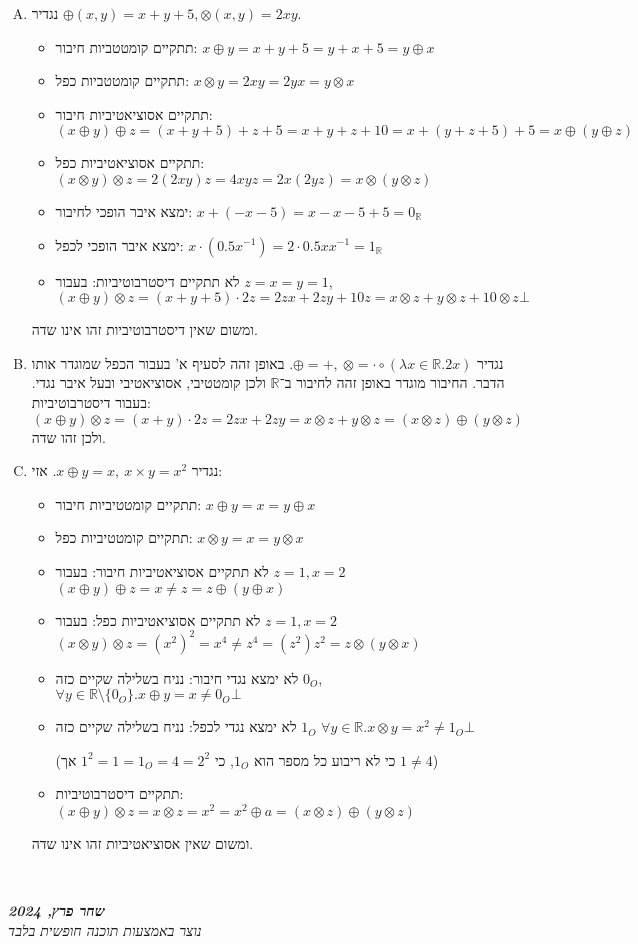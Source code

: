\documentclass[]{article}
\newcommand\ndoc  {\dotfill \\ \vfil {\begin{center} {\textbf{\textit{שחר פרץ, 2024}} \\ \scriptsize \textit{נוצר באמצעות תוכנה חופשית בלבד}} \end{center}} \vfil	}
\newcommand\R     {\mathbb{R}}
\newcommand\op    {^{-1}}
\begin{document}
	\begin{enumerate}[A.]
		\item נגדיר $\oplus(x, y) = x + y + 5, \otimes(x, y) = 2xy$. 
		\begin{itemize}
			\item תתקיים קומטטביות חיבור: \hfill $x \oplus y = x + y + 5 = y + x + 5 = y \oplus x$
			\item תתקיים קומטטביות כפל: \hfill $x \otimes y = 2xy = 2yx = y \otimes x$
			\item תתקיים אסוציאטיביות חיבור: \hfill $(x \oplus y)\oplus z = (x + y + 5) + z + 5 = x + y + z + 10 = x + (y + z + 5) + 5 = x \oplus (y \oplus z)$
			\item תתקיים אסוציאטיביות כפל: \hfill $(x \otimes y) \otimes z = 2(2xy)z = 4xyz = 2x(2yz) = x \otimes (y \otimes z)$
			\item ימצא איבר הופכי לחיבור: \hfill $x + (-x - 5) = x - x - 5 + 5 = 0_\R$
			\item ימצא איבר הופכי לכפל: \hfill $x \cdot (0.5x\op) = 2 \cdot 0.5 x x\op = 1_\R$
			\item לא תתקיים דיסטרבוטיביות: בעבור $z = x = y = 1$, \ \hfill $(x \oplus y) \otimes z = (x + y + 5) \cdot 2z = 2zx + 2zy + 10z = x \otimes z + y \otimes z + 10 \otimes z \bot$
		\end{itemize}
		ומשום שאין דיסטרבוטיביות זהו אינו שדה. 
		
		\item נגדיר $\oplus = +, \ \otimes = \cdot \circ (\lambda x \in \R. 2x)$. 
		באופן זהה לסעיף א' בעבור הכפל שמוגדר אותו הדבר. החיבור מוגדר באופן זהה לחיבור ב־$\R$ ולכן קומטטיבי, אסוציאטיבי ובעל איבר נגדי. בעבור דיסטרבוטיביות: 
		\[ (x \oplus y) \otimes z = (x + y) \cdot 2z = 2zx + 2zy = x \otimes z + y \otimes z = (x \otimes z) \oplus (y \otimes z) \]
		ולכן זהו שדה. 
		\item נגדיר $x \oplus y = x, \ x \times y = x^2$. אזי: 
		\begin{itemize}
			\item תתקיים קומטטיביות חיבור: \hfill $x \oplus y = x = y \oplus x$
			\item תתקיים קומטטיביות כפל: \hfill $x \otimes y = x = y \otimes x$
			\item לא תתקיים אסוציאטיביות חיבור: בעבור $z = 1, x = 2$ \hfill $(x \oplus y) \oplus z = x \neq z =  z \oplus (y \oplus x)$
			\item לא תתקיים אסוציאטיביות כפל: בעבור $z = 1, x = 2$ \hfill $(x \otimes y) \otimes z = (x^2)^2 =x^4 \neq z^4 = (z^2)z^2 =  z \otimes (y \otimes x)$
			\item לא ימצא נגדי חיבור: נניח בשלילה שקיים כזה  $0_O$, \hfill $\forall y \in \R \setminus \{0_O\}. x \oplus y = x \neq 0_O \bot$
			\item לא ימצא נגדי לכפל: נניח בשלילה שקיים כזה $1_O$ \hfill $\forall y \in \R. x \otimes y = x^2 \neq 1_O \bot$
			
				(כי לא ריבוע כל מספר הוא $1_O$, כי $1^2 = 1 = 1_O = 4 = 2^2$ אך $1 \neq 4$)
			\item תתקיים דיסטרבוטיביות: \hfill $(x \oplus y) \otimes z = x \otimes z = x^2 = x^2 \oplus a = (x \otimes z) \oplus (y \otimes z)$
		\end{itemize}
		ומשום שאין אסוציאטיביות זהו אינו שדה. 
	\end{enumerate}
	
	\ndoc
	
	
\end{document}
